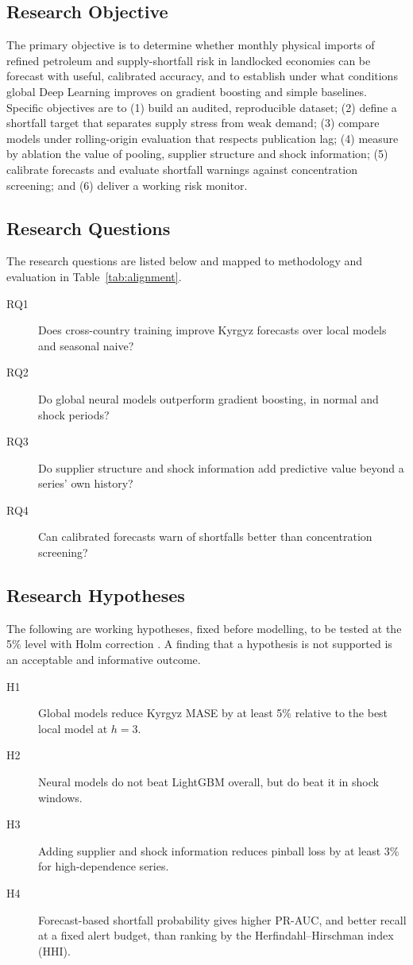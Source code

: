 \documentclass[conference]{IEEEtran}
\begin{document}
\subsection{Research Objective}
The primary objective is to determine whether monthly physical imports of refined petroleum and supply-shortfall risk in landlocked economies can be forecast with useful, calibrated accuracy, and to establish under what conditions global Deep Learning improves on gradient boosting and simple baselines. Specific objectives are to (1) build an audited, reproducible dataset; (2) define a shortfall target that separates supply stress from weak demand; (3) compare models under rolling-origin evaluation that respects publication lag; (4) measure by ablation the value of pooling, supplier structure and shock information; (5) calibrate forecasts and evaluate shortfall warnings against concentration screening; and (6) deliver a working risk monitor.

\subsection{Research Questions}
The research questions are listed below and mapped to methodology and evaluation in Table~\ref{tab:alignment}.

\begin{description}
\item[RQ1] Does cross-country training improve Kyrgyz forecasts over local models and seasonal naive?
\item[RQ2] Do global neural models outperform gradient boosting, in normal and shock periods?
\item[RQ3] Do supplier structure and shock information add predictive value beyond a series' own history?
\item[RQ4] Can calibrated forecasts warn of shortfalls better than concentration screening?
\end{description}

\subsection{Research Hypotheses}
The following are working hypotheses, fixed before modelling, to be tested at the 5\% level with Holm correction \cite{holm1979}. A finding that a hypothesis is not supported is an acceptable and informative outcome.

\begin{description}
\item[H1] Global models reduce Kyrgyz MASE by at least 5\% relative to the best local model at $h=3$.
\item[H2] Neural models do not beat LightGBM overall, but do beat it in shock windows.
\item[H3] Adding supplier and shock information reduces pinball loss by at least 3\% for high-dependence series.
\item[H4] Forecast-based shortfall probability gives higher PR-AUC, and better recall at a fixed alert budget, than ranking by the Herfindahl--Hirschman index (HHI).
\end{description}
\end{document}
